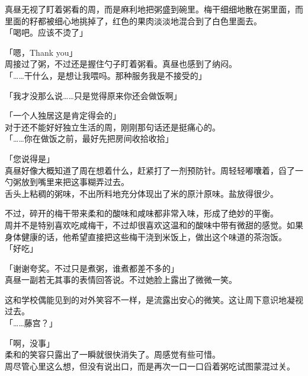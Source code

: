真昼无视了盯着粥看的周，而是麻利地把粥盛到碗里。梅干细细地散在粥里面，而里面的籽都被细心地挑掉了，红色的果肉淡淡地混合到了白色里面去。\\

「喝吧。应该不烫了」

「嗯，Thank you」\\

周接过了粥，不过还是握住勺子盯着粥看。真昼也感到了纳闷。\\

「……干什么，是想让我喂吗。那种服务我是不接受的」

「我才没那么说……只是觉得原来你还会做饭啊」

「一个人独居这是肯定得会的」\\

对于还不能好好独立生活的周，刚刚那句话还是挺痛心的。\\

「……你在做饭之前，最好先把房间收拾收拾」

「您说得是」\\

真昼好像大概知道了周在想着什么，赶紧打了一剂预防针。周轻轻嘟囔着，舀了一勺粥放到嘴里来把这事糊弄过去。\\

舌头上粘稠的粥味，不出所料地充分体现出了米的原汁原味。盐放得很少。

不过，碎开的梅干带来柔和的酸味和咸味都非常入味，形成了绝妙的平衡。\\

周并不是特别喜欢吃咸梅干，不过却很喜欢这温和的酸味中带有微甜的感觉。如果身体健康的话，他希望直接把这些梅干浇到米饭上，做出这个味道的茶泡饭。\\

「好吃」

「谢谢夸奖。不过只是煮粥，谁煮都差不多的」\\

真昼一副若无其事的表情回答说。不过她脸上露出了微微一笑。

这和学校偶能见到的对外笑容不一样，是流露出安心的微笑。这让周下意识地凝视过去。\\

「……藤宫？」

「啊，没事」\\

柔和的笑容只露出了一瞬就很快消失了。周感觉有些可惜。\\

周尽管心里这么想，但没有说出口，而是再次一口一口舀着粥吃试图蒙混过关。
